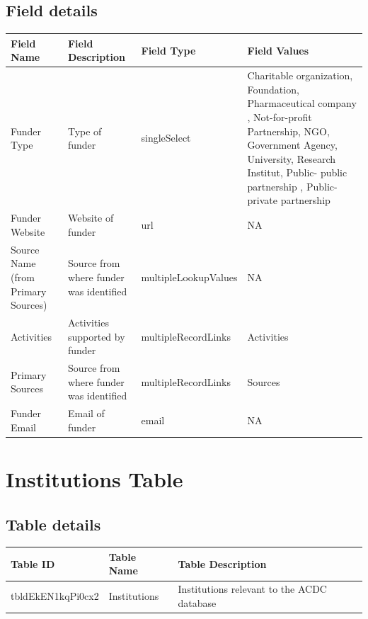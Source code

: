 \documentclass[
]{book}
\begin{document}
\hypertarget{field-details-1}{%
\subsection{Field details}\label{field-details-1}}

\begin{table}
\centering
\begin{tabular}{l|l|l|l}
\hline
\textbf{Field Name} & \textbf{Field Description} & \textbf{Field Type} & \textbf{Field Values}\\
\hline
Funder Type & Type of funder & singleSelect & Charitable organization, Foundation, Pharmaceutical company , Not-for-profit Partnership, NGO, Government Agency, University, Research Institut, Public- public partnership , Public-private partnership\\
\hline
Funder Website & Website of funder & url & NA\\
\hline
Source Name (from Primary Sources) & Source from where funder was identified & multipleLookupValues & NA\\
\hline
Activities & Activities supported by funder & multipleRecordLinks & Activities\\
\hline
Primary Sources & Source from where funder was identified & multipleRecordLinks & Sources\\
\hline
Funder Email & Email of funder & email & NA\\
\hline
\end{tabular}
\end{table}

\hypertarget{institutions-table}{%
\section{Institutions Table}\label{institutions-table}}

\hypertarget{table-details-5}{%
\subsection{Table details}\label{table-details-5}}

\begin{table}
\centering
\begin{tabular}{l|l|l}
\hline
\textbf{Table ID} & \textbf{Table Name} & \textbf{Table Description}\\
\hline
tbldEkEN1kqPi0cx2 & Institutions & Institutions relevant to the ACDC database\\
\hline
\end{tabular}
\end{table}
\end{document}
